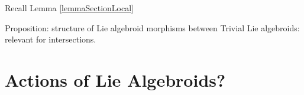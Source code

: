 Recall Lemma \ref{lemmaSectionLocal}

Proposition: structure of Lie algebroid morphisms between Trivial Lie algebroids: relevant for intersections.

\section{Actions of Lie Algebroids?}


